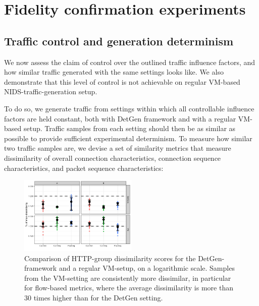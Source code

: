\documentclass[sigconf]{acmart}
\begin{document}
\section{Fidelity confirmation experiments}\label{Sec:Experiments}




\subsection{Traffic control and generation determinism}
We now assess the claim of control over the outlined traffic influence factors, and how similar traffic generated with the same settings looks like. We also demonstrate that this level of control is not achievable on regular VM-based NIDS-traffic-generation setup.

To do so, we generate traffic from settings within which all controllable influence factors are held constant, both with DetGen framework and with a regular VM-based setup. Traffic samples from each setting should then be as similar as possible to provide sufficient experimental determinism. To measure how similar two traffic samples are, we devise a set of similarity metrics that measure dissimilarity of overall connection characteristics, connection sequence characteristics, and packet sequence characteristics:


\begin{figure}
\centering
\includegraphics[width=0.5\textwidth]{images/Exp1.png}
\caption{Comparison of HTTP-group dissimilarity scores for the DetGen-framework and a regular VM-setup, on a logarithmic scale. Samples from the VM-setting are consistently more dissimilar, in particular for flow-based metrics, where the average dissimilarity is more than 30 times higher than for the DetGen setting.}\label{Fig:determ-metric}
\end{figure}
\end{document}
